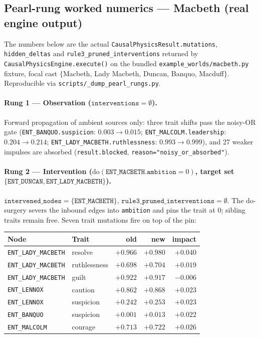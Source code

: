 \documentclass[11pt]{article}
\begin{document}
\subsection{Pearl-rung worked numerics --- Macbeth (real engine output)}
\label{app:ex-pearl-rungs}

The numbers below are the actual
\texttt{CausalPhysicsResult.mutations}, \texttt{hidden\_deltas} and
\texttt{rule3\_pruned\_interventions} returned by
\texttt{CausalPhysicsEngine.execute()} on the bundled
\texttt{example\_worlds/macbeth.py} fixture, focal cast
$\{$Macbeth, Lady Macbeth, Duncan, Banquo, Macduff$\}$.
Reproducible via \texttt{scripts/\_dump\_pearl\_rungs.py}.

\paragraph{Rung 1 --- Observation
($\texttt{interventions}=\emptyset$).} Forward propagation of
ambient sources only: three trait shifts pass the noisy-OR gate
(\texttt{ENT\_BANQUO.suspicion}: $0.003 \!\to\! 0.015$;
\texttt{ENT\_MALCOLM.leadership}: $0.204 \!\to\! 0.214$;
\texttt{ENT\_LADY\_MACBETH.ruthlessness}: $0.993 \!\to\! 0.999$),
and 27 weaker impulses are absorbed
(\texttt{result.blocked}, \texttt{reason="noisy\_or\_absorbed"}).

\paragraph{Rung 2 --- Intervention
($\mathrm{do}(\texttt{ENT\_MACBETH.ambition}{=}0)$, target set
$\{\texttt{ENT\_DUNCAN}, \texttt{ENT\_LADY\_MACBETH}\}$).}
$\texttt{intervened\_nodes} =
\{\texttt{ENT\_MACBETH}\}$,
$\texttt{rule3\_pruned\_interventions}=\emptyset$. The do-surgery
severs the inbound edges into \texttt{ambition} and pins the
trait at $0$; sibling traits remain free. Seven trait mutations
fire on top of the pin:

\begin{table}[h]
\centering
\small
\begin{tabular}{llrrr}
\toprule
Node & Trait & old & new & impact \\
\midrule
\texttt{ENT\_LADY\_MACBETH} & resolve     & $+0.966$ & $+0.980$ & $+0.040$ \\
\texttt{ENT\_LADY\_MACBETH} & ruthlessness & $+0.698$ & $+0.704$ & $+0.019$ \\
\texttt{ENT\_LADY\_MACBETH} & guilt       & $+0.922$ & $+0.917$ & $-0.006$ \\
\texttt{ENT\_LENNOX}        & caution     & $+0.862$ & $+0.868$ & $+0.023$ \\
\texttt{ENT\_LENNOX}        & suspicion   & $+0.242$ & $+0.253$ & $+0.023$ \\
\texttt{ENT\_BANQUO}        & suspicion   & $+0.001$ & $+0.013$ & $+0.022$ \\
\texttt{ENT\_MALCOLM}       & courage     & $+0.713$ & $+0.722$ & $+0.026$ \\
\bottomrule
\end{tabular}
\end{table}
\end{document}
